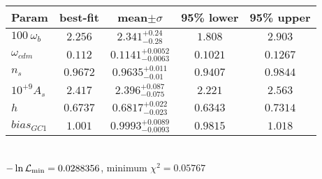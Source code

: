 \begin{tabular}{|l|c|c|c|c|} 
 \hline 
Param & best-fit & mean$\pm\sigma$ & 95\% lower & 95\% upper \\ \hline 
$100~\omega_{b }$ &$2.256$ & $2.341_{-0.28}^{+0.24}$ & $1.808$ & $2.903$ \\ 
$\omega_{cdm }$ &$0.112$ & $0.1141_{-0.0063}^{+0.0052}$ & $0.1021$ & $0.1267$ \\ 
$n_{s }$ &$0.9672$ & $0.9635_{-0.01}^{+0.011}$ & $0.9407$ & $0.9844$ \\ 
$10^{+9}A_{s }$ &$2.417$ & $2.396_{-0.075}^{+0.087}$ & $2.221$ & $2.563$ \\ 
$h$ &$0.6737$ & $0.6817_{-0.023}^{+0.022}$ & $0.6343$ & $0.7314$ \\ 
$bias_{GC 1 }$ &$1.001$ & $0.9993_{-0.0093}^{+0.0089}$ & $0.9815$ & $1.018$ \\ 
\hline 
 \end{tabular} \\ 
$-\ln{\cal L}_\mathrm{min} =0.0288356$, minimum $\chi^2=0.05767$ \\ 
